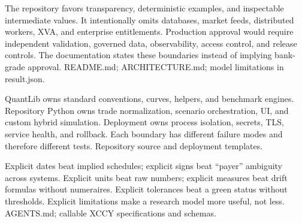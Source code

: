 {The repository favors transparency, deterministic examples, and inspectable intermediate values.}
{It intentionally omits databases, market feeds, distributed workers, XVA, and enterprise entitlements.}
{Production approval would require independent validation, governed data, observability, access control, and release controls.}
{The documentation states these boundaries instead of implying bank-grade approval.}
{README.md; ARCHITECTURE.md; model limitations in result.json.}

{QuantLib owns standard conventions, curves, helpers, and benchmark engines.}
{Repository Python owns trade normalization, scenario orchestration, UI, and custom hybrid simulation.}
{Deployment owns process isolation, secrets, TLS, service health, and rollback.}
{Each boundary has different failure modes and therefore different tests.}
{Repository source and deployment templates.}

{Explicit dates beat implied schedules; explicit signs beat ``payer'' ambiguity across systems.}
{Explicit units beat raw numbers; explicit measures beat drift formulas without numeraires.}
{Explicit tolerances beat a green status without thresholds.}
{Explicit limitations make a research model more useful, not less.}
{AGENTS.md; callable XCCY specifications and schemas.}
